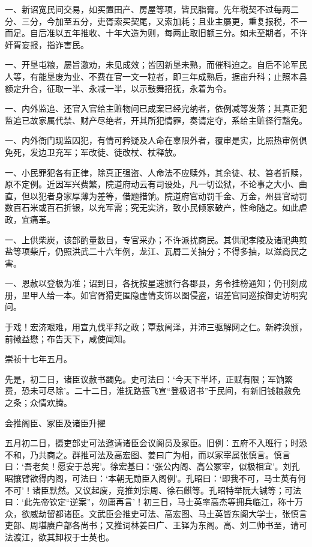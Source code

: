 \documentclass[]{article}
\begin{document}
一、新诏宽民间交易，如买置田产、房屋等项，皆民脂膏。先年税契不过每两二分、三分，今加至五分，吏胥索买契尾，又索加耗；且业主屡更，重复报税，不一而足。自后准以五年推收、十年大造为则，每两止取旧额三分。如未至期者，不许奸胥妄报，指诈害民。

一、开垦屯粮，屡旨激劝，未见成效；皆因新垦未熟，而催科迫之。自后不论军民人等，有能垦废为业、不费在官一文一粒者，即三年成熟后，据亩升科；止照本县额定升合，征取一半、永减一半，以示鼓舞招抚，永着为令。

一、内外监追、还官入官给主赃物问已成案已经完纳者，依例减等发落；其真正犯监追已故家属代禁、财产尽绝者，开其所犯情罪，奏请定夺，系给主赃径行豁免。

一、内外衙门现监囚犯，有情可矜疑及人命在辜限外者，覆审是实，比照热审例俱免死，发边卫充军；军改徒、徒改杖、杖释放。

一、小民罪犯各有正律，除真正强盗、人命法不应赎外，其余徒、杖、笞者折赎，原不定例。近因军兴费繁，院道府动云有司设处，凡一切讼狱，不论事之大小、曲直，但以犯者身家厚薄为差等，借题措饷。院道府官动罚千金、万金，州县官动罚数百石米或百石折银，以充军需；究无实济，致小民倾家破产，性命随之。如此虐政，宜痛革。

一、上供柴炭，该部酌量数目，专官采办；不许派扰商民。其供祀孝陵及诸祀典煎盐等项柴斤，仍照洪武二十六年例，龙江、瓦屑二关抽分；不得多抽，以滋商民之害。

一、恩赦以登极为准；诏到日，各抚按星速颁行各郡县，务令挂榜通知；仍刊刻成册，里甲人给一本。如官胥猾吏匿隐虚情支饰以图侵盗，诏差官同巡按御史访明究问。

于戏！宏济艰难，用宣九伐平邦之政；覃敷闿泽，并沛三驱解网之仁。新綍涣颁，前徽益懋；布告天下，咸使闻知。

崇祯十七年五月。

先是，初二日，诸臣议赦书蠲免。史可法曰：`今天下半坏，正赋有限；军饷繁费，恐未可尽除'。二十二日，淮抚路振飞宣``登极诏书''于民间，有新旧钱粮赦免之条；众情欢腾。

会推阁臣、冢臣及诸臣升擢

五月初二日，摄吏部史可法邀请诸臣会议阁员及冢臣。旧例：五府不入班行；时恐不和，乃共商之。群推可法及高宏图、姜曰广为相，而以冢宰属张慎言。慎言曰：`吾老矣！愿安于总宪'。徐宏基曰：`张公内阁、高公冢宰，似极相宜'。刘孔昭攘臂欲得内阁，可法曰：`本朝无勋臣入阁例'。孔昭曰：`即我不可，马士英有何不可'！诸臣默然。又议起废，竞推刘宗周、徐石麒等。孔昭特举阮大铖等；可法曰：`此先帝钦定``逆案''，勿庸再言'！初三日，马士英率高杰等拥兵临江，称十万众，欲威劫留都诸臣。文武臣会推史可法、高宏图、马土英皆东阁大学士，张慎言吏部、周堪赓户部各尚书；又推词林姜曰广、王铎为东阁。高、刘二帅书至，请可法渡江，欲其卸权于士英也。
\end{document}
